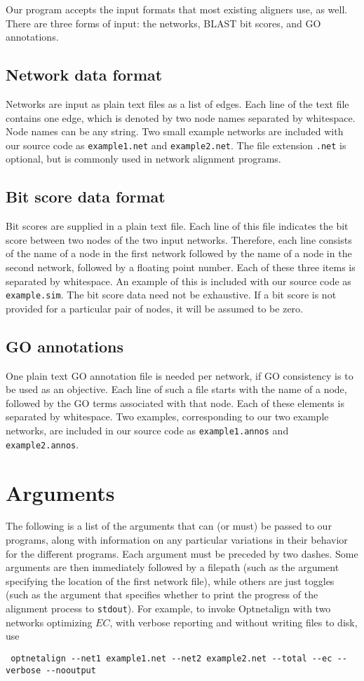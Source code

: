 \documentclass[11pt]{article} %
\begin{document}
Our program accepts the input formats that most existing aligners use, as well. There are three forms of input: the networks, BLAST bit scores, and GO annotations.

\subsection{Network data format}
Networks are input as plain text files as a list of edges. Each line of the text file contains one edge, which is denoted by two node names separated by whitespace. Node names can be any string. Two small example networks are included with our source code as \texttt{example1.net} and \texttt{example2.net}. The file extension \texttt{.net} is optional, but is commonly used in network alignment programs.

\subsection{Bit score data format}
Bit scores are supplied in a plain text file. Each line of this file indicates the bit score between two nodes of the two input networks. Therefore, each line consists of the name of a node in the first network followed by the name of a node in the second network, followed by a floating point number. Each of these three items is separated by whitespace. An example of this is included with our source code as \texttt{example.sim}. The bit score data need not be exhaustive. If a bit score is not provided for a particular pair of nodes, it will be assumed to be zero.

\subsection{GO annotations}
One plain text GO annotation file is needed per network, if GO consistency is to be used as an objective. Each line of such a file starts with the name of a node, followed by the GO terms associated with that node. Each of these elements is separated by whitespace. Two examples, corresponding to our two example networks, are included in our source code as \texttt{example1.annos} and \texttt{example2.annos}.

\section{Arguments}

The following is a list of the arguments that can (or must) be passed to our programs, along with information on any particular variations in their behavior for the different programs. Each argument must be preceded by two dashes. Some arguments are then immediately followed by a filepath (such as the argument specifying the location of the first network file), while others are just toggles (such as the argument that specifies whether to print the progress of the alignment process to \texttt{stdout}). For example, to invoke Optnetalign with two networks  optimizing \(EC\), with verbose reporting and without writing files to disk, use \begin{verbatim} optnetalign --net1 example1.net --net2 example2.net --total --ec --verbose --nooutput \end{verbatim}
\end{document}
